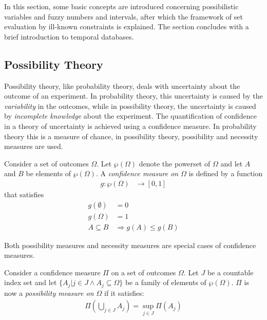 In this section, some basic concepts are introduced concerning possibilistic variables and fuzzy numbers and intervals, after which the framework of set evaluation by ill-known constraints \cite{Pons2011} is explained. The section concludes with a brief introduction to temporal databases.

\subsection{\label{subsec:possibility-theory}Possibility Theory}
Possibility theory, like probability theory, deals with uncertainty about the outcome of an experiment. In probability theory, this uncertainty is caused by the \emph{variability} in the outcomes, while in possibility theory, the uncertainty is caused by \emph{incomplete knowledge} about the experiment. The quantification of confidence in a theory of uncertainty is achieved using a confidence measure\cite{Pons2011}. In probability theory this is a measure of chance, in possibility theory, possibility and necessity measures are used.

\begin{definition}
Consider a set of outcomes $\Omega$. Let $\wp(\Omega)$ denote the powerset of $\Omega$ and let $A$ and $B$ be elements of $\wp(\Omega)$. A \emph{confidence measure on $\Omega$} is defined by a function
	\begin{align}
	g : \wp(\Omega) & \rightarrow \left[0,1\right]
	\end{align}
that satisfies
	\begin{align}
	g(\emptyset) &= 0 \\
	g(\Omega) &= 1 	\label{NormalizationProperty} \\
	A \subseteq B &\Rightarrow g(A) \leq g(B) \label{MonotonicityProperty}
	\end{align}
\end{definition}

Both possibility measures and necessity measures are special cases of confidence measures.

\begin{definition}
Consider a confidence measure $\Pi$ on a set of outcomes $\Omega$. Let $J$ be a countable index set and let $\{ A_{j} | j \in J \wedge A_{j} \subseteq \Omega \}$ be a family of elements of $\wp(\Omega)$. $\Pi$ is now a \emph{possibility measure on $\Omega$} if it satisfies:
	\begin{align}
	\Pi\left(\bigcup_{j \in J} A_{j} \right) = \sup_{j \in J} \Pi(A_{j})
	\end{align}
\end{definition}

